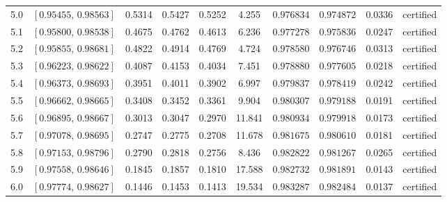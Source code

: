 {\begin{center}
\begin{tabular}{@{}lccccccccl@{}}
\rule[-3pt]{0pt}{11.5pt} 5.0 & $[0.95455,\,0.98563]$ & 0.5314 & 0.5427 & 0.5252 & 4.255 & $0.976834$ & $0.974872$ & 0.0336 & certified \\
\rule[-3pt]{0pt}{11.5pt} 5.1 & $[0.95800,\,0.98538]$ & 0.4675 & 0.4762 & 0.4613 & 6.236 & $0.977278$ & $0.975836$ & 0.0247 & certified \\
\rule[-3pt]{0pt}{11.5pt} 5.2 & $[0.95855,\,0.98681]$ & 0.4822 & 0.4914 & 0.4769 & 4.724 & $0.978580$ & $0.976746$ & 0.0313 & certified \\
\rule[-3pt]{0pt}{11.5pt} 5.3 & $[0.96223,\,0.98622]$ & 0.4087 & 0.4153 & 0.4034 & 7.451 & $0.978880$ & $0.977605$ & 0.0218 & certified \\
\rule[-3pt]{0pt}{11.5pt} 5.4 & $[0.96373,\,0.98693]$ & 0.3951 & 0.4011 & 0.3902 & 6.997 & $0.979837$ & $0.978419$ & 0.0242 & certified \\
\rule[-3pt]{0pt}{11.5pt} 5.5 & $[0.96662,\,0.98665]$ & 0.3408 & 0.3452 & 0.3361 & 9.904 & $0.980307$ & $0.979188$ & 0.0191 & certified \\
\rule[-3pt]{0pt}{11.5pt} 5.6 & $[0.96895,\,0.98667]$ & 0.3013 & 0.3047 & 0.2970 & 11.841 & $0.980934$ & $0.979918$ & 0.0173 & certified \\
\rule[-3pt]{0pt}{11.5pt} 5.7 & $[0.97078,\,0.98695]$ & 0.2747 & 0.2775 & 0.2708 & 11.678 & $0.981675$ & $0.980610$ & 0.0181 & certified \\
\rule[-3pt]{0pt}{11.5pt} 5.8 & $[0.97153,\,0.98796]$ & 0.2790 & 0.2818 & 0.2756 & 8.436 & $0.982822$ & $0.981267$ & 0.0265 & certified \\
\rule[-3pt]{0pt}{11.5pt} 5.9 & $[0.97558,\,0.98646]$ & 0.1845 & 0.1857 & 0.1810 & 17.588 & $0.982732$ & $0.981891$ & 0.0143 & certified \\
\rule[-3pt]{0pt}{11.5pt} 6.0 & $[0.97774,\,0.98627]$ & 0.1446 & 0.1453 & 0.1413 & 19.534 & $0.983287$ & $0.982484$ & 0.0137 & certified \\
\bottomrule
\end{tabular}\end{center}
}
